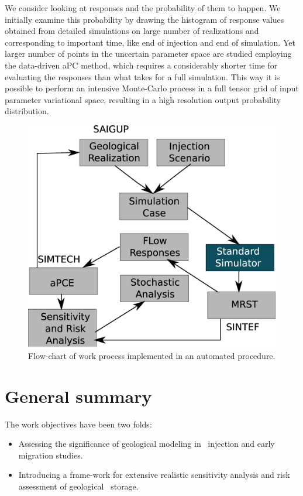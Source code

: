We consider looking at responses and the probability of them to happen. We
initially examine this probability by drawing the histogram of response values
obtained from detailed simulations on large number of realizations and
corresponding to important time, like end of injection and end of simulation.
Yet larger number of points in the uncertain parameter space are studied
employing the data-driven aPC method, which requires a considerably shorter time
for evaluating the responses than what takes for a full simulation. This way it is possible to perform an intensive
Monte-Carlo process in a full tensor grid of input parameter variational space,
resulting in a high resolution output probability distribution.


\begin{figure}[thb]
  \centering
  \includegraphics[width=0.65 \linewidth]{./figurer/ENCL} 
  \caption{Flow-chart of work process implemented in an automated procedure.}
  \label{fig:encl}
%
\end{figure}

\section{General summary}
\label{sec:generalSummary}

The work objectives have been two folds:
\begin{itemize}
\item Assessing the significance of geological modeling in \coo\ injection and early migration studies.
\item Introducing a frame-work for extensive realistic sensitivity analysis and risk assessment of geological \coo\ storage.
\end{itemize}

